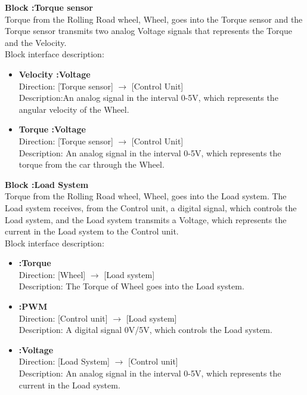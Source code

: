 \textbf{Block :Torque sensor}\\
Torque from the Rolling Road wheel, Wheel, goes into the Torque sensor and the Torque sensor transmits two analog Voltage signals that represents the Torque and the Velocity.\\Block interface description:

\begin{itemize}
	\item \textbf{Velocity :Voltage}\\
		Direction: [Torque sensor] $\rightarrow$ [Control Unit]\\
		Description:An analog signal in the interval 0-5V, which represents the angular velocity of the Wheel.
	\item \textbf{Torque :Voltage}\\
		Direction: [Torque sensor] $\rightarrow$ [Control Unit]\\
		Description: An analog signal in the interval 0-5V, which represents the torque from the car through the Wheel.
\end{itemize}

\textbf{Block :Load System}\\
Torque from the Rolling Road wheel, Wheel, goes into the Load system. The Load system receives, from the Control unit, a digital signal, which controls the Load system, and the Load system transmits a Voltage, which represents the current in the Load system to the Control unit.\\
Block interface description:

\begin{itemize}
	\item \textbf{:Torque}\\
		Direction: [Wheel] $\rightarrow$ [Load system]\\
		Description: The Torque of Wheel goes into the Load system.
	\item \textbf{:PWM}\\
		Direction: [Control unit] $\rightarrow$ [Load system]\\
		Description: A digital signal 0V/5V, which controls the Load system.
	\item \textbf{:Voltage}\\
		Direction: [Load System] $\rightarrow$ [Control unit]\\
		Description: An analog signal in the interval 0-5V, which represents the current in the Load system.
\end{itemize}

